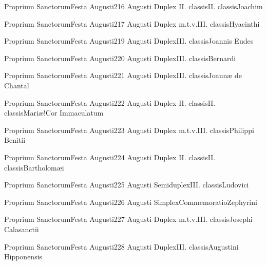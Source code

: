 \documentclass[liber-responsorialis_aestivus.tex]{subfiles}
\begin{document}
	{Proprium Sanctorum}{Festa Augusti}{2}{16 Augusti}
	{Duplex II. classis}{II. classis}{Joachim}
	{}
	{}
\rubric{\conprubric}

	{Proprium Sanctorum}{Festa Augusti}{2}{17 Augusti}
	{Duplex m.t.v.}{III. classis}{Hyacinthi}
	{\conprubric}
	{\respdetemp}

	{Proprium Sanctorum}{Festa Augusti}{2}{19 Augusti}
	{Duplex}{III. classis}{Joannis Eudes}
	{\conprubric}
	{\respdetemp}

	{Proprium Sanctorum}{Festa Augusti}{2}{20 Augusti}
	{Duplex}{III. classis}{Bernardi}
	{\conpdorubric}
	{\respdetemp}

	{Proprium Sanctorum}{Festa Augusti}{2}{21 Augusti}
	{Duplex}{III. classis}{Joannæ de Chantal}
	{\nnrubric}
	{\respdetemp}

	{Proprium Sanctorum}{Festa Augusti}{2}{22 Augusti}
	{Duplex II. classis}{II. classis}{Mariæ!Cor Immaculatum}
	{}
	{}
\rubric{\cbmvrubric}

	{Proprium Sanctorum}{Festa Augusti}{2}{23 Augusti}
	{Duplex m.t.v.}{III. classis}{Philippi Benitii}
	{\conprubric}
	{\respdetemp}

	{Proprium Sanctorum}{Festa Augusti}{2}{24 Augusti}
	{Duplex II. classis}{II. classis}{Bartholomæi}
	{}
	{}
\rubric{\apexrubric}

	{Proprium Sanctorum}{Festa Augusti}{2}{25 Augusti}
	{Semiduplex}{III. classis}{Ludovici}
	{\conprubric}
	{\respdetemp}

	{Proprium Sanctorum}{Festa Augusti}{2}{26 Augusti}
	{Simplex}{Commemoratio}{Zephyrini}
	{}
	{}
\rubric{\respdetemp}

	{Proprium Sanctorum}{Festa Augusti}{2}{27 Augusti}
	{Duplex m.t.v.}{III. classis}{Josephi Calasanctii}
	{\conprubric}
	{\respdetemp}

	{Proprium Sanctorum}{Festa Augusti}{2}{28 Augusti}
	{Duplex}{III. classis}{Augustini Hipponensis}
	{\copodorubric}
	{\respdetemp}
\end{document}
